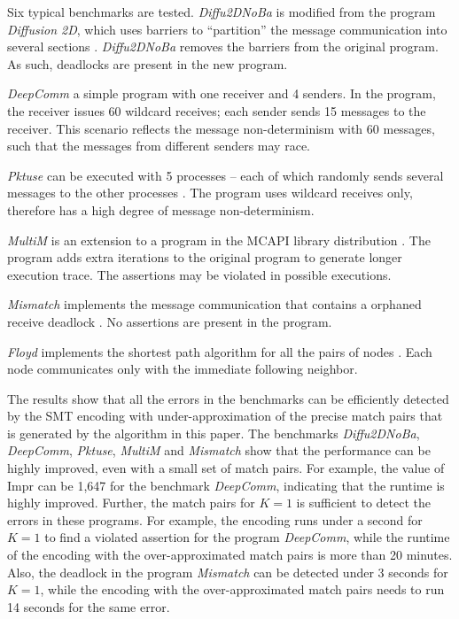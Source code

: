 Six typical benchmarks are tested. \textit{Diffu2DNoBa} is modified from the program \textit{Diffusion 2D}, which uses barriers to “partition” the message communication into several sections \cite{benchmark:fevs}. \textit{Diffu2DNoBa} removes the barriers from the original program. As such, deadlocks are present in the new program.

\textit{DeepComm} a simple program with one receiver and 4 senders. In the program, the receiver issues 60 wildcard receives; each sender sends 15 messages to the receiver.
This scenario reflects the message non-determinism with 60 messages, such that the messages from different senders may race.

\textit{Pktuse} can be executed with 5 processes -- each of which randomly sends several messages to the other processes \cite{mpptest_benchmark}. The program uses wildcard receives only, therefore has a high degree of message non-determinism.

\textit{MultiM} is an extension to a program in the MCAPI library distribution \cite{DBLP:conf/kbse/HuangMM13}. The program adds extra iterations to the original program to generate longer execution trace. The assertions may be violated in possible executions.

\textit{Mismatch} implements the message communication that contains a orphaned receive deadlock \cite{HuangDeadlock}. No assertions are present in the program.

\textit{Floyd} implements the shortest path algorithm for all the pairs of nodes \cite{DBLP:conf/ppopp/XueLWGCZZV09}. Each node communicates only with the immediate following neighbor. 

The results show that all the errors in the benchmarks can be efficiently detected by the SMT encoding with under-approximation of the precise match pairs that is generated by the algorithm in this paper. The benchmarks \textit{Diffu2DNoBa}, \textit{DeepComm}, \textit{Pktuse}, \textit{MultiM} and \textit{Mismatch} show that the performance can be highly improved, even with a small set of match pairs. For example, the value of $\mathrm{Impr}$ can be 1,647 for the benchmark \textit{DeepComm}, indicating that the runtime is highly improved.
Further, the match pairs for $K=1$ is sufficient to detect the errors in these programs. 
For example, the encoding runs under a second for $K=1$ to find a violated assertion for the program \textit{DeepComm}, while the runtime of the encoding with the over-approximated match pairs is more than 20 minutes. Also, the deadlock in the program \textit{Mismatch} can be detected under 3 seconds for $K=1$, while the encoding with the over-approximated match pairs needs to run 14 seconds for the same error. 

